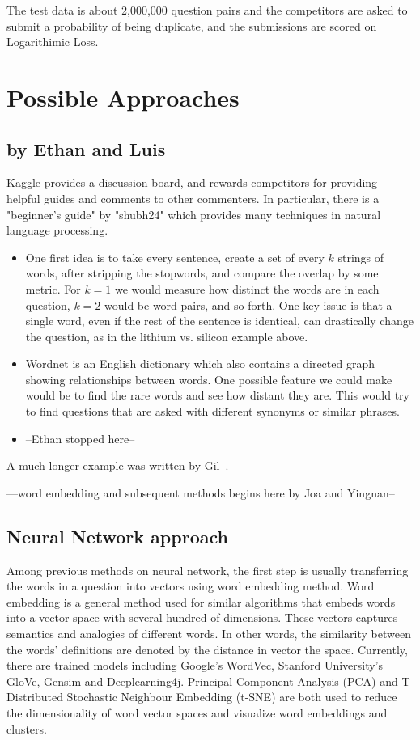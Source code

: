 \documentclass[12pt]{article}
\begin{document}
The test data is about 2,000,000 question pairs and the competitors are asked to submit a probability of being duplicate, and the submissions are scored on Logarithimic Loss.

\section{Possible Approaches}\label{approaches}
\subsection{by Ethan and Luis}
Kaggle provides a discussion board, and rewards competitors for providing helpful guides and comments to other commenters. In particular, there is a "beginner's guide" by "shubh24" which provides many techniques in natural language processing.
\begin{itemize}
\item One first idea is to take every sentence, create a set of every $k$ strings of words, after stripping the stopwords, and compare the overlap by some metric. For $k=1$ we would measure how distinct the words are in each question, $k=2$ would be word-pairs, and so forth. One key issue is that a single word, even if the rest of the sentence is identical, can drastically change the question, as in the lithium vs. silicon example above.
\item Wordnet is an English dictionary which also contains a directed graph showing relationships between words. One possible feature we could make would be to find the rare words and see how distant they are. This would try to find questions that are asked with different synonyms or similar phrases.
\item --Ethan stopped here--
\end{itemize}

A much longer \LaTeXe{} example was written by Gil~\cite{Gil:02}.


---word embedding and subsequent methods begins here by Joa and Yingnan--\\

\subsection{Neural Network approach} 
Among previous methods on neural network, the first step is usually transferring the words in a question into vectors using word embedding method. Word embedding is a general method used for similar algorithms that embeds words into a vector space with several hundred of dimensions. These vectors captures semantics and analogies of different words. In other words, the similarity between the words' definitions are denoted by the distance in vector the space. Currently, there are trained models including Google’s WordVec, Stanford University’s GloVe, Gensim and Deeplearning4j.  Principal Component Analysis (PCA) and T-Distributed Stochastic Neighbour Embedding (t-SNE) are both used to reduce the dimensionality of word vector spaces and visualize word embeddings and clusters.
\end{document}
